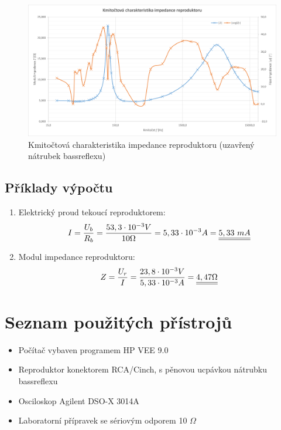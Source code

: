 \documentclass[a4paper, czech]{article}
\begin{document}
\begin{figure}[H]
    \centering
    \includegraphics[width=\textwidth]{graf3b_zavreny.png}
    \caption{Kmitočtová charakteristika impedance reproduktoru (uzavřený nátrubek bassreflexu)}
\end{figure}

\break

\subsection{Příklady výpočtu}

\begin{enumerate}
    \item Elektrický proud tekoucí reproduktorem:
    \begin{multline*}
        I = \frac{U_b}{R_b} = \frac{53,3 \cdot 10^{-3} V}{10 \Omega} = 5,33 \cdot 10^{-3} A = \underline{\underline{5,33\ mA}} \hfill
    \end{multline*}

    \item Modul impedance reproduktoru:
    \begin{multline*}
        Z = \frac{U_r}{I} = \frac{23,8 \cdot 10^{-3} V}{5,33 \cdot 10^{-3} A} = \underline{\underline{4,47 \Omega}} \hfill
    \end{multline*}
\end{enumerate}

\section{Seznam použitých přístrojů}

\begin{itemize}
    \item Počítač vybaven programem HP VEE 9.0
    \item Reproduktor konektorem RCA/Cinch, s pěnovou ucpávkou nátrubku bassreflexu
    \item Osciloskop Agilent DSO-X 3014A
    \item Laboratorní přípravek se sériovým odporem 10 $\Omega$
\end{itemize}
\end{document}
